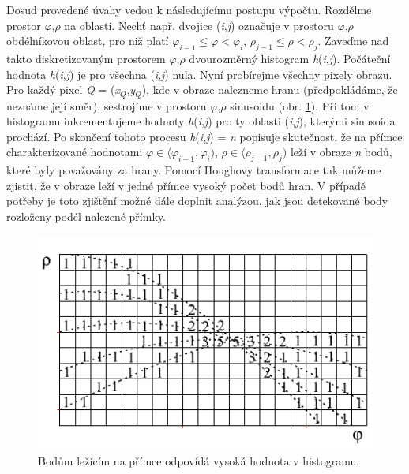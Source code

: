 Dosud provedené úvahy vedou k následujícímu postupu výpočtu. Rozdělme prostor $\varphi$,$\rho$ na oblasti. Nechť např. dvojice (\textit{i},\textit{j}) označuje v prostoru $\varphi$,$\rho$ obdélníkovou oblast, pro niž platí $\varphi_{i-1} \leq \varphi < \varphi_{i}$, $\rho_{j-1} \leq \rho < \rho_j$. Zaveďme nad takto diskretizovaným prostorem $\varphi$,$\rho$ dvourozměrný histogram \textit{h}(\textit{i},\textit{j}). Počáteční hodnota \textit{h}(\textit{i},\textit{j}) je pro všechna (\textit{i},\textit{j}) nula. Nyní probírejme všechny pixely obrazu. Pro každý pixel \textit{Q} = (\textit{x}$_Q$,\textit{y}$_Q$), kde v obraze nalezneme hranu (předpokládáme, že neznáme její směr), sestrojíme v prostoru $\varphi$,$\rho$ sinusoidu (obr. \ref{img:8_21}). Při tom v histogramu inkrementujeme hodnoty \textit{h}(\textit{i},\textit{j}) pro ty oblasti (\textit{i},\textit{j}), kterými sinusoida prochází. Po skončení tohoto procesu \textit{h}(\textit{i},\textit{j}) = \textit{n}  popisuje skutečnost, že na přímce charakterizované hodnotami $\varphi\in\langle\varphi_{i-1}, \varphi_i)$, $\rho\in\langle\rho_{j-1}, \rho_j)$ leží v obraze \textit{n} bodů, které byly považovány za hrany. Pomocí Houghovy transformace tak můžeme zjistit, že v obraze leží v jedné přímce vysoký počet bodů hran. V případě potřeby je toto zjištění možné dále doplnit analýzou, jak jsou detekované body rozloženy podél nalezené přímky.

\begin{figure}[th]
    \begin{center}
        \includegraphics[scale=0.9]{08_segmentace/images/img_8_21.pdf}
    \end{center}
    \caption{Bodům ležícím na přímce odpovídá vysoká hodnota v histogramu.}
    \label{img:8_21}
\end{figure}

